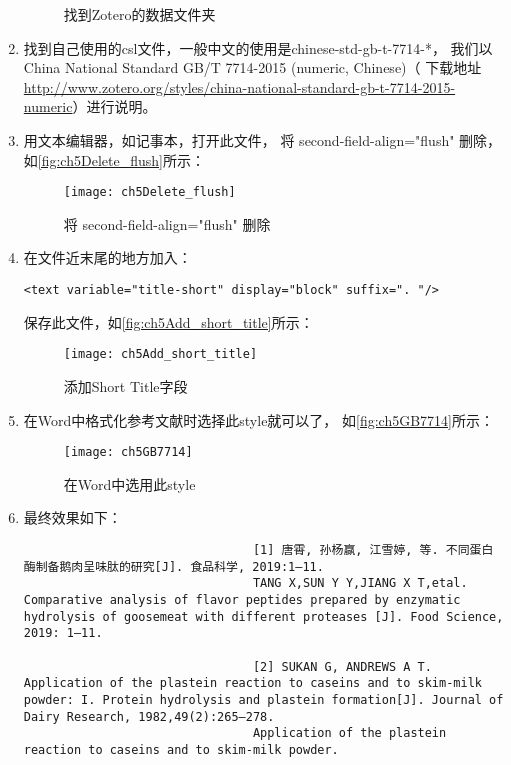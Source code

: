 \documentclass[cn,11pt,chinese]{elegantbook}
\begin{document}
\begin{enumerate}
\begin{figure}[ht]
								\caption{找到Zotero的数据文件夹}
								\label{fig:ch5Styles}
							\end{figure}
						\item 找到自己使用的csl文件，一般中文的使用是chinese-std-gb-t-7714-*，
							我们以China National Standard GB/T 7714-2015 
							(numeric, Chinese)（
							下载地址\url{http://www.zotero.org/styles/china-national-standard-gb-t-7714-2015-numeric}）进行说明。
						\item 	用文本编辑器，如记事本，打开此文件，
							将 second-field-align="flush" 删除，如\autoref{fig:ch5Delete_flush}所示：
							\begin{figure}[ht]
								\centering
								\texttt{[image: ch5Delete\_flush]}
								\caption{将 second-field-align="flush" 删除}
								\label{fig:ch5Delete_flush}
							\end{figure}
						\item 在文件近末尾的地方加入：
							\begin{lstlisting}[language=VBScript]
								<text variable="title-short" display="block" suffix=". "/>
							\end{lstlisting}
							保存此文件，如\autoref{fig:ch5Add_short_title}所示：
								\begin{figure}[ht]
									\centering
									\texttt{[image: ch5Add\_short\_title]}
									\caption{添加Short Title字段}
									\label{fig:ch5Add_short_title}
								\end{figure}
						\item 在Word中格式化参考文献时选择此style就可以了，
						如\autoref{fig:ch5GB7714}所示：
							\begin{figure}[ht]
								\centering
								\texttt{[image: ch5GB7714]}
								\caption{在Word中选用此style}
								\label{fig:ch5GB7714}
							\end{figure}
						\item 最终效果如下：
							\begin{lstlisting}
								[1] 唐霄, 孙杨赢, 江雪婷, 等. 不同蛋白酶制备鹅肉呈味肽的研究[J]. 食品科学, 2019:1–11. 
								TANG X,SUN Y Y,JIANG X T,etal. Comparative analysis of flavor peptides prepared by enzymatic hydrolysis of goosemeat with different proteases [J]. Food Science, 2019: 1–11.
								
								[2] SUKAN G, ANDREWS A T. Application of the plastein reaction to caseins and to skim-milk powder: I. Protein hydrolysis and plastein formation[J]. Journal of Dairy Research, 1982,49(2):265–278. 
								Application of the plastein reaction to caseins and to skim-milk powder.
								

\end{lstlisting}
\end{enumerate}
\end{document}
